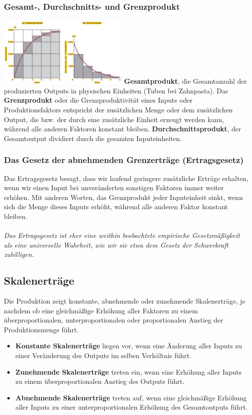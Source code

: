 \documentclass[10pt]{scrartcl}
\begin{document}
\subsubsection{Gesamt-, Durchschnitts- und Grenzprodukt}
\includegraphics[width=0.48\textwidth]{img/grenzprodukt.jpg}
{\bf Gesamtprodukt}, die Gesamtanzahl der produzierten Outputs in physischen Einheiten (Tuben bei Zahnpasta). Das {\bf Grenzprodukt } oder die Grenzproduktivität eines Inputs oder Produktionsfaktors entspricht der zusätzlichen Menge oder dem zusätzlichen Output, die bzw. der durch eine zusätzliche Einheit erzeugt werden kann, während alle anderen Faktoren konstant bleiben. {\bf Durchschnittsprodukt}, der Gesamtoutput dividiert durch die gesamten Inputeinheiten.
\subsubsection{Das Gesetz der abnehmenden Grenzerträge (Ertragsgesetz)}
Das Ertragsgesetz besagt, dass wir laufend geringere zusätzliche Erträge erhalten, wenn wir einen Input bei unveränderten sonstigen Faktoren immer weiter erhöhen. Mit anderen Worten, das Grenzprodukt jeder Inputeinheit sinkt, wenn sich die Menge dieses Inputs erhöht, während alle anderen Faktor konstant bleiben.\\
\\
{\it Das Ertragsgesetz ist eher eine weithin beobachtete empirische Gesetzmäßigkeit als eine universelle Wahrheit, wie wir sie etwa dem Gesetz der Schwerkraft zubilligen.}
\subsection{Skalenerträge}
Die Produktion zeigt konstante, abnehmende oder zunehmende Skalenerträge, je nachdem ob eine gleichmäßige Erhöhung aller Faktoren zu einem überproportionalen, unterproportionalen oder proportionalen Anstieg der Produktionsmenge führt.\begin{itemize}
\item {\bf Konstante Skalenerträge} liegen vor, wenn eine Änderung aller Inputs zu einer Veränderung des Outputs im selben Verhältnis führt. 
\item {\bf Zunehmende Skalenerträge} treten ein, wenn eine Erhöhung aller Inputs zu einem überproportionalen Anstieg des Outputs führt. 
\item {\bf Abnehmende Skalenerträge } treten auf, wenn eine gleichmäßige Erhöhung aller Inputs zu einer unterproportionalen Erhöhung des Gesamtoutputs führt.
 \end{itemize}
\end{document}
